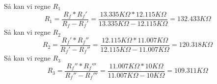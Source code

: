 \noindent
%
Så kan vi regne $R_{1}$
%
\begin{equation}
	R_1 = \frac{R_f*R_f'}{R_f-R_f'} = \frac{13.335K\Omega*12.115K\Omega}{13.335K\Omega-12.115K\Omega} = 132.433K\Omega
\end{equation}
\noindent
%
Så kan vi regne $R_{2}$
%
\begin{equation}
	R_2 = \frac{R_f'*R_f''}{R_f'-R_f''} = \frac{12.115K\Omega*11.007K\Omega}{12.115K\Omega-11.007K\Omega} = 120.318K\Omega
\end{equation}
%
Så kan vi regne $R_{3}$
%
\begin{equation}
	R_3 = \frac{R_f''*R_f'''}{R_f''-R_f'''} = \frac{11.007K\Omega*10K\Omega}{11.007K\Omega-10K\Omega} = 109.311K\Omega
\end{equation}
